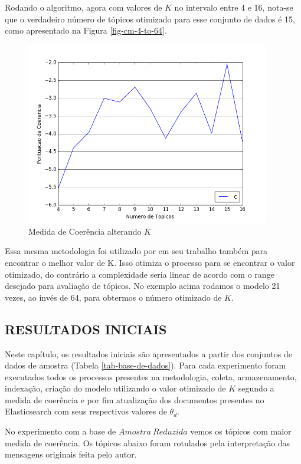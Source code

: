 \documentclass[12pt,a4paper]{article}
\begin{document}
Rodando o algoritmo, agora com valores de $K$ no intervalo entre 4 e 16, nota-se que o verdadeiro número de tópicos otimizado para esse 
 conjunto de dados é 15, como apresentado na Figura \ref{fig-cm-4-to-64}.

\begin{figure}[H]
	\centering
    \includegraphics[height=8cm]{images/figure_6.png}
    \caption{Medida de Coerência alterando $K$}
    \label{fig-cm-4-to-16}
\end{figure}

Essa mesma metodologia foi utilizado por  em seu trabalho também para encontrar o melhor valor de K. Isso otimiza
 o processo para se encontrar o valor otimizado, do contrário a complexidade seria linear de acordo com o range desejado para avaliação de
 tópicos. No exemplo acima rodamos o modelo 21 vezes, ao invés de 64, para obtermos o número otimizado de $K$.

\subsection{RESULTADOS INICIAIS}

Neste capítulo, os resultados iniciais são apresentados a partir dos conjuntos de dados de amostra (Tabela \ref{tab-base-de-dados}).
 Para cada experimento foram executados todos os processos presentes na metodologia, coleta, armazenamento, indexação, criação do modelo utilizando o valor
 otimizado de $K$ segundo a medida de coerência e por fim atualização dos documentos presentes no Elasticsearch com seus respectivos valores de $\theta_d$.


No experimento com a base de $Amostra\ Reduzida$ vemos os tópicos com maior medida de coerência.
 Os tópicos abaixo foram rotulados pela interpretação das mensagens originais feita pelo autor.
\end{document}
